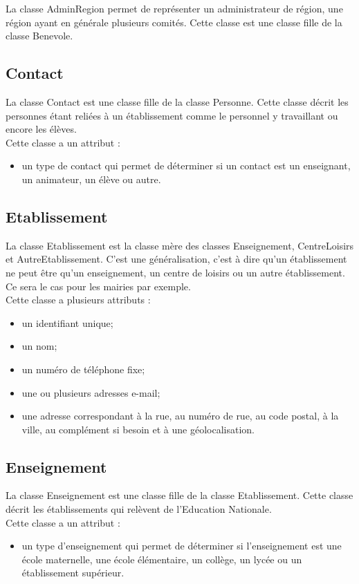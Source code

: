 \documentclass[asi, sansVersion]{picInsa}
\begin{document}
La classe AdminRegion permet de représenter un administrateur de région, une région ayant en générale plusieurs comités. Cette classe est une classe fille de la classe Benevole. 

\subsection*{Contact}

La classe Contact est une classe fille de la classe Personne. Cette classe décrit les personnes étant reliées à un établissement comme le personnel y travaillant ou encore les élèves. \\
Cette classe a un attribut : 
\begin{itemize}
\item un type de contact qui permet de déterminer si un contact est un enseignant, un animateur, un élève ou autre.
\end{itemize} 


\subsection*{Etablissement}

La classe Etablissement est la classe mère des classes Enseignement, CentreLoisirs et AutreEtablissement. C'est une généralisation, c'est à dire qu'un établissement ne peut être qu'un enseignement, un centre de loisirs ou un autre établissement. Ce sera le cas pour les mairies par exemple. \\
Cette classe a plusieurs attributs : 
\begin{itemize}
\item un identifiant unique;
\item un nom;
\item un numéro de téléphone fixe;
\item une ou plusieurs adresses e-mail;
\item une adresse correspondant à la rue, au numéro de rue, au code postal, à la ville, au complément si besoin et à une géolocalisation.
\end{itemize}

\subsection*{Enseignement}
La classe Enseignement est une classe fille de la classe Etablissement. Cette classe décrit les établissements qui relèvent de l'Education Nationale. \\
Cette classe a un attribut : 
\begin{itemize}
\item un type d'enseignement qui permet de déterminer si l'enseignement est une école maternelle, une école élémentaire, un collège, un lycée ou un établissement supérieur. 
\end{itemize} 
\end{document}
